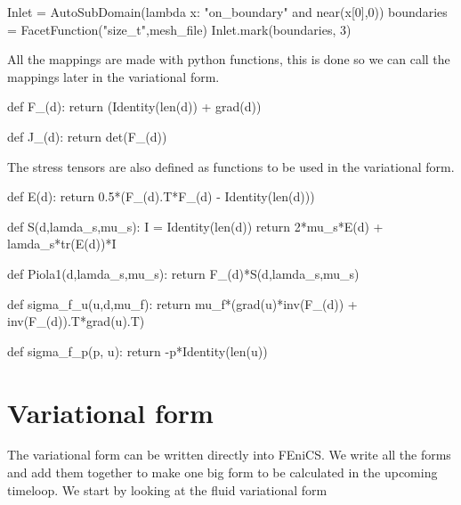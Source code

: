 \begin{python}
Inlet = AutoSubDomain(lambda x: "on_boundary" and near(x[0],0))
boundaries = FacetFunction("size_t",mesh_file)
Inlet.mark(boundaries, 3)
\end{python}


All the mappings are made with python functions, this is done so we can call the mappings later in the variational form.

\begin{python}
def F_(d):
	return (Identity(len(d)) + grad(d))

def J_(d):
	return det(F_(d))
\end{python}

The stress tensors are also defined as functions to be used in the variational form.

\begin{python}
def E(d):
	return 0.5*(F_(d).T*F_(d) - Identity(len(d))) 

def S(d,lamda_s,mu_s):
    I = Identity(len(d))
    return 2*mu_s*E(d) + lamda_s*tr(E(d))*I

def Piola1(d,lamda_s,mu_s):
	return F_(d)*S(d,lamda_s,mu_s)
	
def sigma_f_u(u,d,mu_f):
    return  mu_f*(grad(u)*inv(F_(d)) + inv(F_(d)).T*grad(u).T)

def sigma_f_p(p, u):
    return -p*Identity(len(u))
    
\end{python}

\section{Variational form}

The variational form can be written directly into FEniCS. We write all the forms and add them together to make one big form to be calculated in the upcoming timeloop. We start by looking at the fluid variational form

